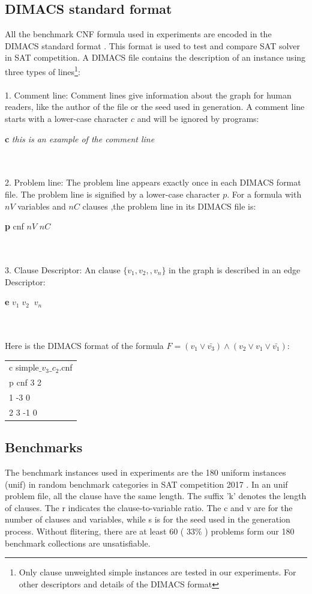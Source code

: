 \documentclass[12pt,a4paper,twoside]{scrartcl}
\numberwithin{equation}{section}
\begin{document}
\subsection{DIMACS standard format}  
All the benchmark CNF formula used in experiments are encoded in the DIMACS standard format \cite{johnson1996cliques}. This format is used to test and compare SAT solver in SAT competition. A DIMACS file contains the description of an instance using three types of lines\footnote {Only clause unweighted simple instances are tested in our experiments. For other descriptors and details of the DIMACS format}:\\ \\ 1. Comment line: Comment lines give information about the graph for human readers, like the author of the file or the seed used in generation. A comment line starts with a lower-case character $c$ and will be ignored by programs:\\ \centerline{\textbf{c} \emph{ this is an example of the comment line }}\\ \\ 2. Problem line: The problem line appears exactly once in each DIMACS format file. The problem line is signified by a lower-case character $p$.  For a formula with $nV$ variables and $nC$ clauses ,the problem line in its DIMACS file is:\\ \centerline{\textbf{p} cnf $nV$ $nC$}\\ \\ 3. Clause Descriptor: An clause $\{v_1, v_2,, v_n\}$ in the graph is described in an edge Descriptor:\\ \centerline{\textbf{e} $v_1\; v_2\;  \;v_n$}\\  
\\
Here is the DIMACS format of the formula $F = (v_1 \lor \bar{v_3}) \land (v_2 \lor v_1 \lor \bar{v_1})$:
\begin{center}
\begin{tabular}{l}
c simple$\_v_3\_c_2$.cnf\\
p cnf 3 2\\
1 -3 0\\
2 3 -1 0 \\
\end{tabular}
\end{center}

\subsection{Benchmarks}
\label{benchmark}
The benchmark instances used in experiments are the 180 uniform instances (unif) in random benchmark categories in SAT competition 2017  \cite{balyo2017proceedings}. In an unif problem file, all the clause have the same length.
The suffix 'k'  denotes the length of clauses. The r indicates the clause-to-variable ratio. The c and v are for the number of clauses and variables, while s is for the seed used in the generation process.
 Without flitering, there are at least 60 ( $33\%$ ) problems form our 180 benchmark collections are unsatisfiable.
\end{document}
